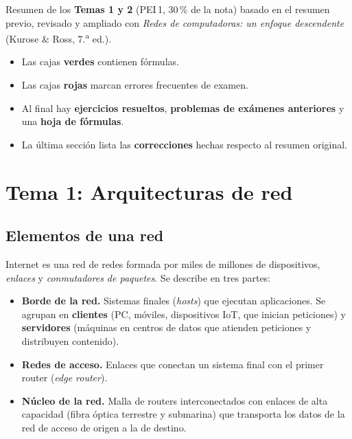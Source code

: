 \documentclass[11pt,a4paper]{article}
\begin{document}
\begin{definicion}
Resumen de los \textbf{Temas 1 y 2} (PEI\,1, 30\,\% de la nota) basado en el resumen previo, revisado y ampliado con \emph{Redes de computadoras: un enfoque descendente} (Kurose \& Ross, 7.\textsuperscript{a} ed.).
\begin{itemize}[leftmargin=1.2em]
  \item Las cajas \textbf{verdes} contienen fórmulas.
  \item Las cajas \textbf{rojas} marcan errores frecuentes de examen.
  \item Al final hay \textbf{ejercicios resueltos}, \textbf{problemas de exámenes anteriores} y una \textbf{hoja de fórmulas}.
  \item La última sección lista las \textbf{correcciones} hechas respecto al resumen original.
\end{itemize}
\end{definicion}

\tableofcontents
\newpage

\section{Tema 1: Arquitecturas de red}

\subsection{Elementos de una red}

Internet es una red de redes formada por miles de millones de dispositivos, \emph{enlaces} y \emph{conmutadores de paquetes}. Se describe en tres partes:

\begin{itemize}
  \item \textbf{Borde de la red.} Sistemas finales (\emph{hosts}) que ejecutan aplicaciones. Se agrupan en \textbf{clientes} (PC, móviles, dispositivos IoT, que inician peticiones) y \textbf{servidores} (máquinas en centros de datos que atienden peticiones y distribuyen contenido).
  \item \textbf{Redes de acceso.} Enlaces que conectan un sistema final con el primer router (\emph{edge router}).
  \item \textbf{Núcleo de la red.} Malla de routers interconectados con enlaces de alta capacidad (fibra óptica terrestre y submarina) que transporta los datos de la red de acceso de origen a la de destino.
\end{itemize}
\end{document}

